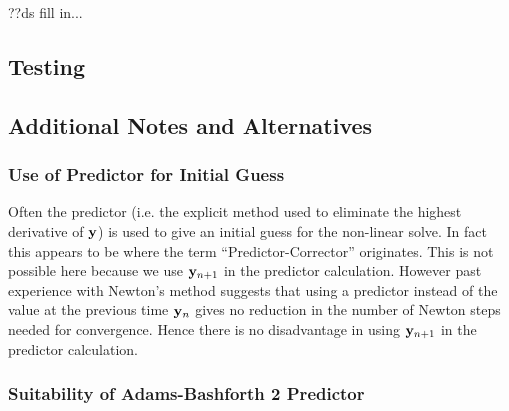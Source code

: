 
??ds fill in...

\subsection{Testing}





\subsection{Additional Notes and Alternatives}


\subsubsection{Use of Predictor for Initial Guess}

Often the predictor (i.e. the explicit method used to eliminate the highest derivative of $\mathbf{y}$) is used to give an initial guess for the non-linear solve.
In fact this appears to be where the term ``Predictor-Corrector'' originates.
This is not possible here because we use $\mathbf{y}_{n+1}$ in the predictor calculation.
However past experience with Newton's method suggests that using a predictor instead of the value at the previous time $\mathbf{y}_n$ gives no reduction in the number of Newton steps needed for convergence.\cite{Milan, Matthias}
Hence there is no disadvantage in using $\mathbf{y}_{n+1}$ in the predictor calculation.

\subsubsection{Suitability of Adams-Bashforth 2 Predictor}

